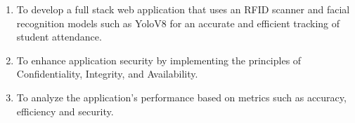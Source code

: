\begin{comment}
How to formulate your research objectives:
1. Identify what research steps do you need to perform to achieve your general objective.
2. Identify the questions that must be answered for you to achieve your general objective.
    Thereafter, convert these questions into action statements

Example #1:

Research Question:
  What are the general features of a web-based learning environment?

Specific Objective:
   To review existing web-based learning environment that teaches language learning for children


Example #2:

Research Question:
   How will you represent commonsense knowledge for use by computer systems?

Specific Objective:
   To identify knowledge representation approaches used by existing story generation systems

Example #3:
Research Question:
   What types of storytelling knowledge are needed to generate stories?

Specific Objective:
    To identify the different types of storytelling knowledge used in generating stories

Example #4:
Research Question:
    What machine learning approaches will you utilize?

Specific Objective:
    To determine existing machine learning algorithms [that can be used in training the computer system to detect cyberbullying cases] 

Example #5: Research Question:
    How will your research output be evaluated?

Specific Objective:
    To define evaluation metrics for validating the accuracy of the translation

\end{comment}

%
%

\begin{enumerate}
   \item To develop a full stack web application that uses an RFID scanner and facial recognition models such as YoloV8 for an accurate and efficient tracking of student attendance.
   \item To enhance application security by implementing the principles of Confidentiality, Integrity, and Availability.
   \item To analyze the application's performance based on metrics such as accuracy, efficiency and security.
\end{enumerate}


